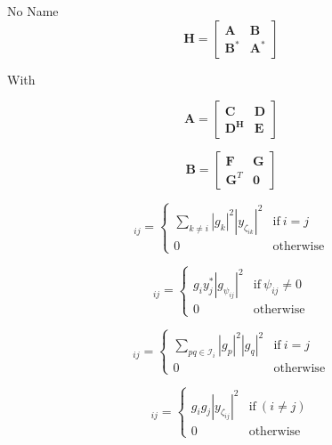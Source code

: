 \documentclass[a4paper,10pt]{article}
\begin{document}
\begin{section}{No Name}
\begin{equation}
\boldsymbol{H} = 
\begin{bmatrix}
\boldsymbol{A} & \boldsymbol{B}\\
\boldsymbol{B}^* & \boldsymbol{A}^*
\end{bmatrix}
\end{equation}

With 

\begin{equation}
\boldsymbol{A} = 
\begin{bmatrix}
\boldsymbol{C} & \boldsymbol{D}\\
\boldsymbol{D^H} & \boldsymbol{E}
\end{bmatrix}
\end{equation}

\begin{equation}
\boldsymbol{B} = 
\begin{bmatrix}
\boldsymbol{F} & \boldsymbol{G}\\
\boldsymbol{G}^T & \boldsymbol{0}
\end{bmatrix}
\end{equation}

\begin{equation}
[\boldsymbol{C}]_{ij} = 
\begin{cases}
 \sum_{k \neq i} \left | g_k \right |^2 \left | y_{\zeta_{ik}} \right |^2 & \textrm{if} ~ i=j\\
 0 & \textrm{otherwise}
\end{cases}
\end{equation}

\begin{equation}
[\boldsymbol{D}]_{ij} = 
\begin{cases}
 g_i y_j^*  \left | g_{\psi_{ij}} \right |^2  & \textrm{if} ~ \psi_{ij}\neq0\\
 0 & \textrm{otherwise}
\end{cases}
\end{equation}

\begin{equation}
[\boldsymbol{E}]_{ij} = 
\begin{cases}
 \sum_{pq \in \mathcal{I}_i} \left | g_p \right |^2 \left | g_q \right |^2  & \textrm{if} ~ i=j\\
 0 & \textrm{otherwise}
\end{cases}
\end{equation}

\begin{equation}
[\boldsymbol{F}]_{ij} = 
\begin{cases}
 g_i g_j  \left | y_{\zeta_{ij}} \right |^2  & \textrm{if} ~ (i \neq j)\\
 0 & \textrm{otherwise}
\end{cases}
\end{equation}


\end{section}
\end{document}
